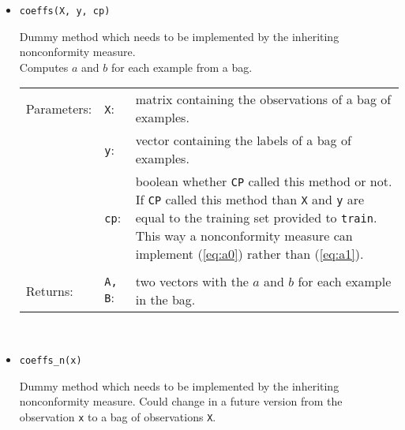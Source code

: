\documentclass[twoside,11pt]{article}
\def\wo{~\\}
\begin{document}
\begin{appendices}
\begin{itemize}
\begin{itemize}
\begin{itemize}
\begin{itemize}
                \item
                  \texttt{coeffs(X, y, cp)}

                  Dummy method which needs to be
                  implemented by the inheriting
                  nonconformity measure.
                  \\

                  Computes $a$ and $b$ for each example
                  from a bag.
                  \\

                  \begin{tabu}{llX}
                    Parameters: &\texttt{X}:
                                &matrix containing the
                                 observations of a bag of
                                 examples.
                                 \\
                                &\texttt{y}:
                                &vector containing the
                                 labels of a bag of
                                 examples.
                                 \\
                                &\texttt{cp}:
                                &boolean whether
                                 \texttt{CP} called this
                                 method or not.
                                 If \texttt{CP} called this
                                 method than \texttt{X} and
                                 \texttt{y} are equal to
                                 the training set provided
                                 to \texttt{train}.
                                 This way a nonconformity
                                 measure can implement
                                 (\ref{eq:a0}) rather than
                                 (\ref{eq:a1}).
                                 \\\\
                      Returns:  &\texttt{A, B}:
                                &two vectors with the $a$
                                 and $b$ for each example
                                 in the bag.
                                 \\
                    \end{tabu}
                    \wo

                \item
                  \texttt{coeffs\_n(x)}

                  Dummy method which needs to be
                  implemented by the inheriting
                  nonconformity measure.
                  Could change in a future version from the
                  observation \texttt{x} to a bag of
                  observations \texttt{X}.
                  \\


\end{itemize}
\end{itemize}
\end{itemize}
\end{itemize}
\end{appendices}
\end{document}
